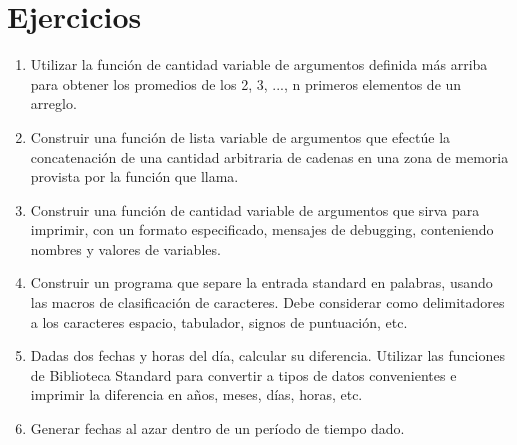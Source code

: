 
\section{Ejercicios}
\label{sec:bstandardej}
\begin{enumerate}
	\item Utilizar la función de cantidad variable de argumentos definida más arriba
para obtener los promedios de los 2, 3, ..., n primeros elementos de un
arreglo.
	\item Construir una función de lista variable de argumentos que efectúe la
concatenación de una cantidad arbitraria de cadenas en una zona de memoria
provista por la función que llama.
	\item Construir una función de cantidad variable de argumentos que sirva para
imprimir, con un formato especificado, mensajes de debugging, conteniendo
nombres y valores de variables.
	\item Construir un programa que separe la entrada standard en palabras, usando las
macros de clasificación de caracteres. Debe considerar como delimitadores a los
caracteres espacio, tabulador, signos de puntuación, etc.
	\item Dadas dos fechas y horas del día, calcular su diferencia. Utilizar las
funciones de Biblioteca Standard para convertir a tipos de datos convenientes e imprimir la
diferencia en años, meses, días, horas, etc.
	\item Generar fechas al azar dentro de un período de tiempo dado.
\end{enumerate}

